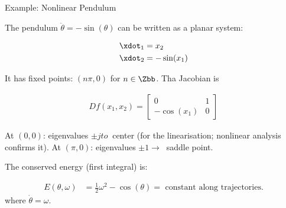 \documentclass[aspectratio=169,xcolor=dvipsnames,svgnames,x11names,fleqn]{beamer}
\begin{document}
\begin{frame}{Example: Nonlinear Pendulum}

    \footnotesize

    The pendulum $\ddot{\theta} = -\sin(\theta)$ can be written as a planar system:

    \begin{align*}
        \xdot_1 & = x_2\\
        \xdot_2 & = -\sin(x_1)
    \end{align*}


    \vspace{5pt}


    It has fixed points: $(n\pi, 0)$ for $ n \in \Zbb$. Tha Jacobian is 

    \begin{align*}
        Df(x_1, x_2) = \begin{bmatrix}
            0 & 1\\
            -\cos(x_1) & 0
        \end{bmatrix}
    \end{align*}
    
    \vspace{3pt}

    At $(0,0)$: eigenvalues $\pm j  to ~$ center (for the linearisation; nonlinear analysis confirms it). At $(\pi, 0)$: eigenvalues $\pm 1 \to ~$ saddle point. 

    \vspace{3pt}

    The conserved energy (first integral) is:


            \begin{tcolorbox}[
        enhanced,
        rounded corners,
        boxrule=0.5pt, 
        leftrule=2mm, 
        colframe=blue!80!red,
        colback=WarmWhite,
        notitle,
        left=1mm 
    ]

    \begin{align*}
    E(\theta, \omega) & = \frac{1}{2} \omega^2 - \cos(\theta) = \text{ constant along trajectories.}    
    \end{align*}
    where $\dot{\theta} = \omega$.
    \end{tcolorbox}
    

\end{frame}
\end{document}
